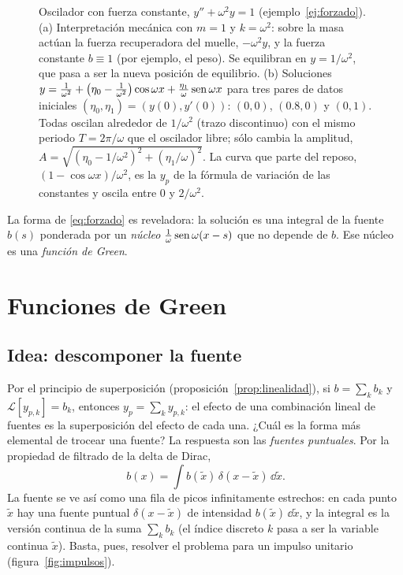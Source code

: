 \documentclass[11pt,twoside]{article}
\newcommand\Lop{\mathcal L}
\newcommand\xt{\tilde x}
\begin{document}
\begin{figure}[!htbp]
\caption{Oscilador con fuerza constante, $y''+\omega^2y=1$ (ejemplo~\ref{ej:forzado}). (a) Interpretación mecánica con
$m=1$ y $k=\omega^2$: sobre la masa actúan la fuerza recuperadora del muelle, $-\omega^2y$, y la fuerza constante $b\equiv1$
(por ejemplo, el peso). Se equilibran en $y=1/\omega^2$, que pasa a ser la nueva posición de equilibrio. (b) Soluciones
$y=\frac1{\omega^2}+\big(\eta_0-\frac1{\omega^2}\big)\cos\omega x+\frac{\eta_1}{\omega}\operatorname{sen}\omega x$ para tres pares de datos
iniciales $(\eta_0,\eta_1)=(y(0),y'(0))$: \textcolor{c0}{$(0,0)$}, \textcolor{c5}{$(0.8,0)$} y \textcolor{c2}{$(0,1)$}. Todas
oscilan alrededor de $1/\omega^2$ (trazo discontinuo) con el mismo periodo $T=2\pi/\omega$ que el oscilador libre; sólo
cambia la amplitud, $A=\sqrt{(\eta_0-1/\omega^2)^2+(\eta_1/\omega)^2}$. La curva que parte del reposo,
$(1-\cos\omega x)/\omega^2$, es la $y_p$ de la fórmula de variación de las constantes y oscila entre $0$ y $2/\omega^2$.}
\label{fig:muelle}
\end{figure}

La forma de \eqref{eq:forzado} es reveladora: la solución es una integral de la fuente $b(s)$ ponderada por un
\emph{núcleo} $\frac1\omega\operatorname{sen}\omega(x-s)$ que no depende de $b$. Ese núcleo es una \emph{función de Green}.

\section{Funciones de Green}\label{sec:green}

\subsection{Idea: descomponer la fuente}

Por el principio de superposición (proposición~\ref{prop:linealidad}), si $b=\sum_kb_k$ y $\Lop[y_{p,k}]=b_k$, entonces
$y_p=\sum_ky_{p,k}$: el efecto de una combinación lineal de fuentes es la superposición del efecto de cada una. ¿Cuál es la
forma más elemental de trocear una fuente? La respuesta son las \emph{fuentes puntuales}. Por la propiedad de filtrado de
la delta de Dirac,
\begin{equation}\label{eq:filtrado}
b(x)=\int b(\xt)\,\delta(x-\xt)\,\dd\xt.
\end{equation}
La fuente se ve así como una fila de picos infinitamente estrechos: en cada punto $\xt$ hay una fuente puntual
$\delta(x-\xt)$ de intensidad $b(\xt)\,\dd\xt$, y la integral es la versión continua de la suma $\sum_kb_k$ (el índice
discreto $k$ pasa a ser la variable continua $\xt$). Basta, pues, resolver el problema para un impulso unitario
(figura~\ref{fig:impulsos}).
\end{document}
